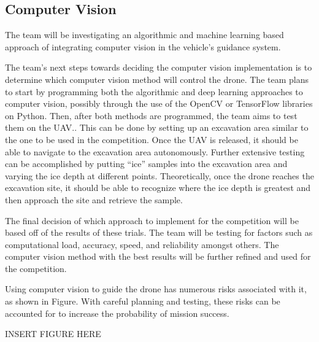 		\subsection{Computer Vision}
		The team will be investigating an algorithmic and machine learning based approach of integrating computer vision in the vehicle’s guidance system. 

The team’s next steps towards deciding the computer vision implementation is to determine which computer vision method will control the drone. The team plans to start by programming both the algorithmic and deep learning approaches to computer vision, possibly through the use of the OpenCV or TensorFlow libraries on Python. Then, after both methods are programmed, the team aims to test them on the UAV.. This can be done by setting up an excavation area similar to the one to be used in the competition. Once the UAV is released, it should be able to navigate to the excavation area autonomously. Further extensive testing can be accomplished by putting “ice” samples into the excavation area and varying the ice depth at different points. Theoretically, once the drone reaches the excavation site, it should be able to recognize where the ice depth is greatest and then approach the site and retrieve the sample.

The final decision of which approach to implement for the competition will be based off of the results of these trials. The team will be testing for factors such as computational load, accuracy, speed, and reliability amongst others. The computer vision method with the best results will be further refined and used for the competition.

Using computer vision to guide the drone has numerous risks associated with it, as shown in Figure. With careful planning and testing, these risks can be accounted for to increase the probability of mission success.

INSERT FIGURE HERE